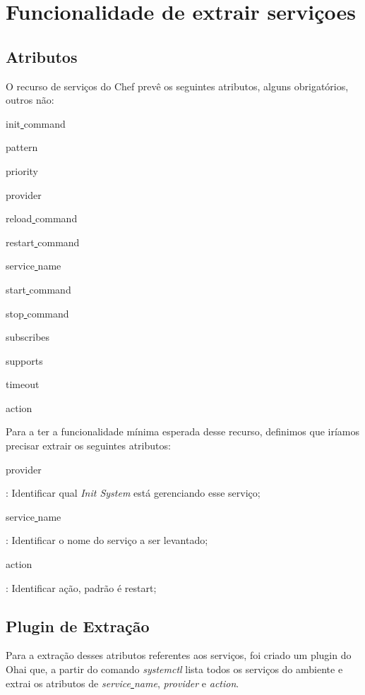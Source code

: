 \section{Funcionalidade de extrair serviçoes}
\label{sec:services}

\subsection{Atributos}

O recurso de serviços do Chef prevê os seguintes atributos, alguns obrigatórios, outros não:

\begin{itemize}
{\itshape\item init\underline{ }command}
{\itshape\item pattern}
{\itshape\item priority}
{\itshape\item provider}
{\itshape\item reload\underline{ }command}
{\itshape\item restart\underline{ }command}
{\itshape\item service\underline{ }name}
{\itshape\item start\underline{ }command}
{\itshape\item stop\underline{ }command}
{\itshape\item subscribes}
{\itshape\item supports}
{\itshape\item timeout}
{\itshape\item action}
\end{itemize}

Para a ter a funcionalidade mínima esperada desse recurso, definimos que iríamos precisar
extrair os seguintes atributos:


\begin{itemize}
    {\itshape\item provider}: Identificar qual \textit{Init System} está gerenciando
esse serviço;
    {\itshape\item service\underline{ }name}: Identificar o nome do serviço a
ser levantado;
    {\itshape\item action}: Identificar ação, padrão é restart;
\end{itemize}

\subsection{Plugin de Extração}
Para a extração desses atributos referentes aos serviços, foi criado um plugin do
Ohai que, a partir do comando \textit{systemctl} lista todos os serviços do ambiente
e extrai os atributos de \textit{service\underline{ }name}, \textit{provider}
e \textit{action}.

